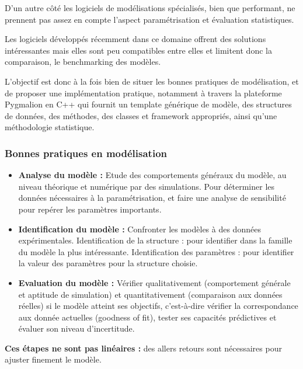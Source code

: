D’un autre côté les logiciels de modélisations spécialisés, bien que performant, ne prennent pas assez en compte l’aspect paramétrisation et évaluation statistiques.

Les logiciels développés récemment dans ce domaine offrent des solutions intéressantes mais elles sont peu compatibles entre elles et limitent donc la comparaison, le benchmarking des modèles.

L’objectif est donc à la fois bien de situer les bonnes pratiques de modélisation, et de proposer une implémentation pratique, notamment à travers la plateforme Pygmalion en C++ qui fournit un template générique de modèle, des structures de données, des méthodes, des classes et framework appropriés, ainsi qu’une méthodologie statistique.

\subsubsection{Bonnes pratiques en modélisation}

\begin{itemize}

\item \textbf{Analyse du modèle :} Etude des comportements généraux du modèle, au niveau théorique et numérique par des simulations. Pour déterminer les données nécessaires à la paramétrisation, et faire une analyse de sensibilité pour repérer les paramètres importants.
\item \textbf{Identification du modèle :} Confronter les modèles à des données expérimentales. Identification de la structure : pour identifier dans la famille du modèle la plus intéressante. Identification des paramètres : pour identifier la valeur des paramètres pour la structure choisie.
\item \textbf{Evaluation du modèle :} Vérifier qualitativement (comportement générale et aptitude de simulation) et quantitativement (comparaison aux données réelles) si le modèle atteint ses objectifs, c’est-à-dire vérifier la correspondance aux donnée actuelles (goodness of fit), tester ses capacités prédictives et évaluer son niveau d’incertitude.

\end{itemize}

\textbf{Ces étapes ne sont pas linéaires :} des allers retours sont nécessaires pour ajuster finement le modèle.



